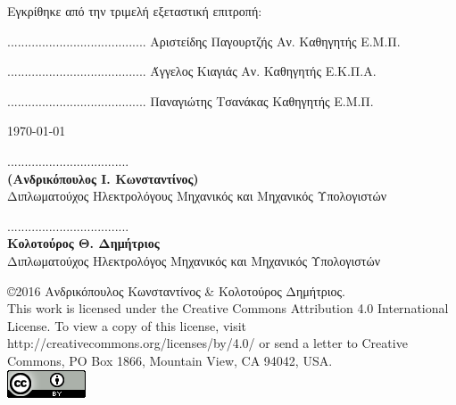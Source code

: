 \documentclass[
11pt, %
english, %
singlespacing, %
parskip, %
headsepline, %
]{MastersDoctoralThesis} %
\begin{document}
\begin{center}
\noindent
\small
Εγκρίθηκε από την τριμελή εξεταστική επιτροπή:

\vfill

\begin{center}
\scriptsize
\parbox[b]{0.3\textwidth} {\center
	........................................
	Αριστείδης Παγουρτζής
	Αν. Καθηγητής Ε.Μ.Π.
}
\parbox[b]{0.3\textwidth} {\center
	........................................
	Άγγελος Κιαγιάς
	Αν. Καθηγητής Ε.Κ.Π.Α.
}
\parbox[b]{0.3\textwidth} {\center
	........................................
	Παναγιώτης Τσανάκας
	Καθηγητής Ε.Μ.Π.
}
\end{center}


\vfill
{\large \today}\\[4cm] %

\end{center}


\pagebreak


\vspace{30ex}
\noindent
................................... \\
\textbf{(Ανδρικόπουλος Ι. Κωνσταντίνος)} \\
Διπλωματούχος Ηλεκτρολόγους Μηχανικός και Μηχανικός Υπολογιστών \\
\vspace{8ex}

\noindent
................................... \\
\textbf{Κολοτούρος Θ. Δημήτριος} \\
Διπλωματούχος Ηλεκτρολόγος Μηχανικός και Μηχανικός Υπολογιστών \\
\vspace{8ex}

\vfill

\small
\noindent
\copyright \hspace{1em}2016 Ανδρικόπουλος Κωνσταντίνος \& Κολοτούρος Δημήτριος.\\

This work is licensed under the Creative Commons Attribution 4.0 International License. To view a copy of this license, visit http://creativecommons.org/licenses/by/4.0/ or send a letter to Creative Commons, PO Box 1866, Mountain View, CA 94042, USA. \\[0.2cm]
\includegraphics[scale=0.9]{cc.png}
\pagebreak
\end{document}
